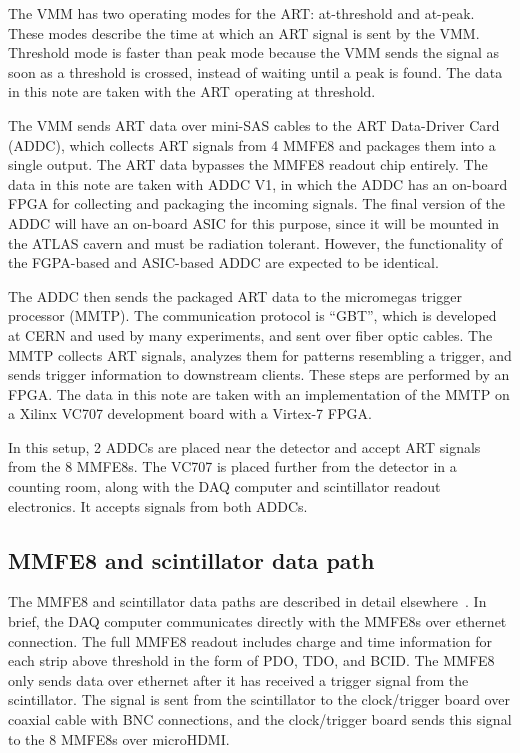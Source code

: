 The VMM has two operating modes for the ART: at-threshold and at-peak. These modes describe the time at which an ART signal is sent by the VMM. Threshold mode is faster than peak mode because the VMM sends the signal as soon as a threshold is crossed, instead of waiting until a peak is found. The data in this note are taken with the ART operating at threshold.

The VMM sends ART data over mini-SAS cables to the ART Data-Driver Card (ADDC), which collects ART signals from 4 MMFE8 and packages them into a single output. The ART data bypasses the MMFE8 readout chip entirely. The data in this note are taken with ADDC V1, in which the ADDC has an on-board FPGA for collecting and packaging the incoming signals. The final version of the ADDC will have an on-board ASIC for this purpose, since it will be mounted in the ATLAS cavern and must be radiation tolerant. However, the functionality of the FGPA-based and ASIC-based ADDC are expected to be identical.

The ADDC then sends the packaged ART data to the micromegas trigger processor (MMTP). The communication protocol is ``GBT'', which is developed at CERN and used by many experiments, and sent over fiber optic cables. The MMTP collects ART signals, analyzes them for patterns resembling a trigger, and sends trigger information to downstream clients. These steps are performed by an FPGA. The data in this note are taken with an implementation of the MMTP on a Xilinx VC707 development board with a Virtex-7 FPGA.

In this setup, 2 ADDCs are placed near the detector and accept ART signals from the 8 MMFE8s. The VC707 is placed further from the detector in a counting room, along with the DAQ computer and scintillator readout electronics. It accepts signals from both ADDCs.

\subsection{MMFE8 and scintillator data path}
\label{sec:exp-mmfe}

The MMFE8 and scintillator data paths are described in detail elsewhere~\cite{noisy,noiseless}. In brief, the DAQ computer communicates directly with the MMFE8s over ethernet connection. The full MMFE8 readout includes charge and time information for each strip above threshold in the form of PDO, TDO, and BCID. The MMFE8 only sends data over ethernet after it has received a trigger signal from the scintillator. The signal is sent from the scintillator to the clock/trigger board over coaxial cable with BNC connections, and the clock/trigger board sends this signal to the 8 MMFE8s over microHDMI.

